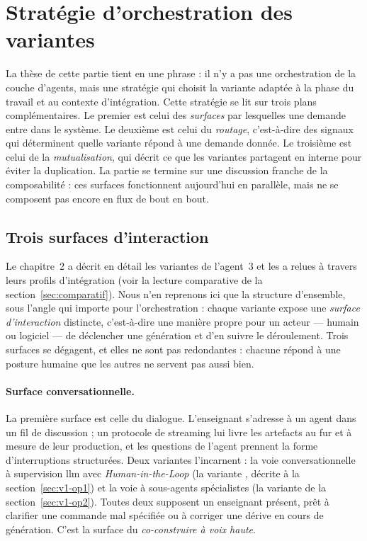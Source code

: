 \section{Stratégie d'orchestration des variantes}
\label{sec:strategie-orchestration}

La thèse de cette partie tient en une phrase : il n'y a pas une
orchestration de la couche d'agents, mais une stratégie qui choisit la
variante adaptée à la phase du travail et au contexte d'intégration.
Cette stratégie se lit sur trois plans complémentaires. Le premier est
celui des \emph{surfaces} par lesquelles une demande entre dans le
système. Le deuxième est celui du \emph{routage}, c'est-à-dire des
signaux qui déterminent quelle variante répond à une demande donnée.
Le troisième est celui de la \emph{mutualisation}, qui décrit ce que
les variantes partagent en interne pour éviter la duplication. La
partie se termine sur une discussion franche de la composabilité :
ces surfaces fonctionnent aujourd'hui en parallèle, mais ne se
composent pas encore en flux de bout en bout.

\subsection{Trois surfaces d'interaction}
\label{sec:surfaces}

Le chapitre~2 a décrit en détail les variantes de l'agent~3 et les a
relues à travers leurs profils d'intégration (voir la lecture
comparative de la section~\ref{sec:comparatif}). Nous n'en reprenons
ici que la structure d'ensemble, sous l'angle qui importe pour
l'orchestration : chaque variante expose une \emph{surface
d'interaction} distincte, c'est-à-dire une manière propre pour un
acteur — humain ou logiciel — de déclencher une génération et d'en
suivre le déroulement. Trois surfaces se dégagent, et elles ne sont
pas redondantes : chacune répond à une posture humaine que les autres
ne servent pas aussi bien.

\paragraph{Surface conversationnelle.}
La première surface est celle du dialogue. L'enseignant s'adresse à un
agent dans un fil de discussion ; un protocole de streaming lui livre
les artefacts au fur et à mesure de leur production, et les questions
de l'agent prennent la forme d'interruptions structurées. Deux
variantes l'incarnent : la voie conversationnelle à supervision
\gls{llm} avec \emph{Human-in-the-Loop} (la variante
, décrite à la section~\ref{sec:v1-op1})
et la voie à sous-agents spécialistes (la variante 
de la section~\ref{sec:v1-op2}). Toutes deux supposent un enseignant
présent, prêt à clarifier une commande mal spécifiée ou à corriger une
dérive en cours de génération. C'est la surface du
\emph{co-construire à voix haute}.

